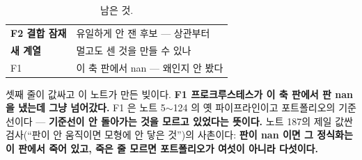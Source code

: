 \documentclass[10pt]{article}
\begin{document}


\begin{table}[t]
\centering\tsize
\caption{남은 것.}
\begin{tabular}{ll}
\toprule
\textbf{F2 결합 잠재} & 유일하게 안 잰 후보 --- 상관부터 \\
\textbf{새 계열} & 멀고도 센 것을 만들 수 있나 \\
F1 & 이 축 판에서 nan --- 왜인지 안 봤다 \\
\bottomrule
\end{tabular}
\end{table}

셋째 줄이 값싸고 이 노트가 만든 빚이다. \textbf{F1 프로크루스테스가 이
축 판에서 판 nan 을 냈는데 그냥 넘어갔다.} F1 은 노트 5$\sim$124 의 옛
파이프라인이고 포트폴리오의 기준선이다 --- \textbf{기준선이 안 돌아가는
것을 모르고 있었다는 뜻이다.} 노트 187의 제일 값싼 검사(``판이 안 움직이면
모형에 안 닿은 것'')의 사촌이다: \textbf{판이 nan 이면 그 정식화는 이
판에서 죽어 있고, 죽은 줄 모르면 포트폴리오가 여섯이 아니라 다섯이다.}
\end{document}
